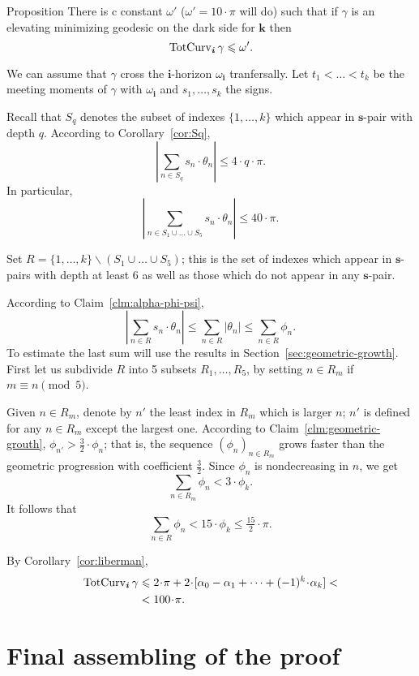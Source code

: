 \documentclass[a4paper,10pt]{amsart}
\begin{document}
\begin{thm}{Proposition}\label{prop:graph}
There is c constant $\omega'$ ($\omega'=10\cdot\pi$ will do)
such that
if $\gamma$ is an elevating minimizing geodesic on the dark side for $\bm{k}$ then
\[\mathop{\rm TotCurv}\nolimits_{\bm{i}}\gamma\leqslant \omega'.\]
\end{thm}

We can assume that
$\gamma$ cross the $\bm{i}$-horizon $\omega_{\bm{i}}$ tranfersally.
Let $t_1<\dots<t_k$ be the meeting moments of $\gamma$ with $\omega_{\bm{i}}$ and
$s_1,\dots,s_k$ the signs.

Recall that $S_q$ denotes the subset of indexes $\{1,\dots,k\}$
which appear in $\bm{s}$-pair with depth $q$.
According to Corollary~\ref{cor:Sq},
\[\left|\sum_{n\in S_q}s_n\cdot\theta_n\right|\le 4\cdot q\cdot \pi.\]
In particular,
\[\left|\sum_{n\in S_1\cup\dots\cup S_5}
s_n\cdot\theta_n\right|
\le 
40\cdot\pi.\]

Set $R=\{1,\dots,k\}\backslash (S_1\cup\dots\cup S_5)$;
this is the set of indexes which appear in $\bm{s}$-pairs with depth at least $6$ 
as well as those which do not appear in any $\bm{s}$-pair.

According to Claim~\ref{clm:alpha-phi-psi},
\[\left|\sum_{n\in R}
s_n\cdot\theta_n\right|
\le
\sum_{n\in R}
|\theta_n|\le \sum_{n\in R}\phi_n.\] 
To estimate the last sum will use the results in Section~\ref{sec:geometric-growth}.
First let us subdivide $R$ into 5 subsets $R_1,\dots,R_5$,
by setting 
$n\in R_m$ if $m\equiv n\pmod 5$.

Given $n\in R_m$, denote by $n'$ the least index in $R_m$ which is larger $n$;
$n'$ is defined for any $n\in R_m$ except the largest one.
According to Claim~\ref{clm:geometric-grouth}, 
$\phi_{n'}>\tfrac32\cdot \phi_n$;
that is, the sequence $(\phi_n)_{n\in R_m}$ grows faster than the geometric progression with coefficient $\tfrac32$.
Since $\phi_n$ is nondecreasing in $n$,
we get 
\[\sum_{n\in R_m}\phi_n< 3\cdot\phi_k.\]
It follows that 
\[\sum_{n\in R}\phi_n< 15\cdot\phi_k\le\tfrac{15}2\cdot\pi.\]

By Corollary~\ref{cor:liberman},
\begin{align*}
\tc_{\bm{i}}\gamma
&\le 
2\cdot\pi
+
2\cdot [\alpha_0-\alpha_1+\dots+(-1)^k\cdot\alpha_k]< 
\\
&< 100\cdot \pi.
\end{align*}
\qeds



\section{Final assembling of the proof}
\end{document}
